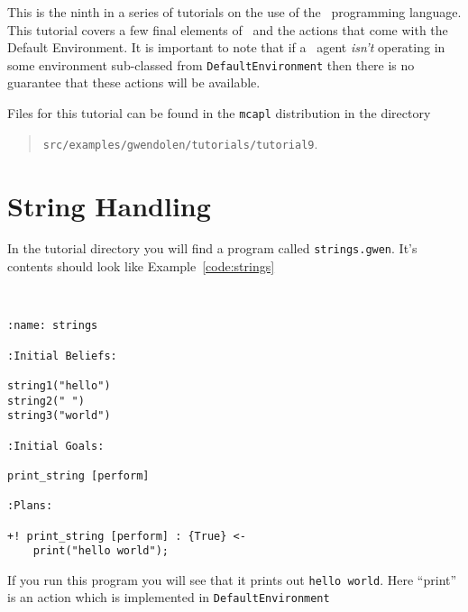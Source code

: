
This is the ninth in a series of tutorials on the use of the \gwendolen\ programming language.  This tutorial covers a few final elements of \gwendolen\ and the actions that come with the Default Environment.  It is important to note that if a \gwendolen\ agent \emph{isn't} operating in some environment sub-classed from \texttt{DefaultEnvironment} then there is no guarantee that these actions will be available.

Files for this tutorial can be found in the \texttt{mcapl} distribution in the directory 
\begin{quote}
\texttt{src/examples/gwendolen/tutorials/tutorial9}.
\end{quote}

\section{String Handling}

In the tutorial directory you will find a program called \texttt{strings.gwen}.  It's contents should look like Example~\ref{code:strings}
\begin{ourexample}
\label{code:strings} \quad \\
\begin{lstlisting}[basicstyle=\sffamily,style=easslisting,language=Gwendolen]
:name: strings

:Initial Beliefs:

string1("hello")
string2(" ")
string3("world")

:Initial Goals:

print_string [perform]

:Plans:

+! print_string [perform] : {True} <-
	print("hello world");
\end{lstlisting}
\end{ourexample}
If you run this program you will see that it prints out \texttt{hello world}.  Here ``print'' is an action which is implemented in \texttt{DefaultEnvironment}

